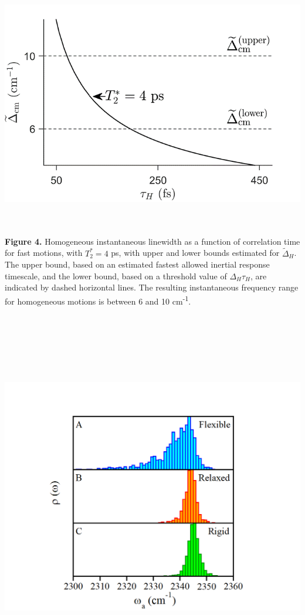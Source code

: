 \documentclass[]{article}
\begin{document}
\includegraphics[width=6.45821in,height=4.31466in]{figure4.png}

\textbf{Figure 4.} Homogeneous instantaneous linewidth as a function of
correlation time for fast motions, with \(T_{2}^{*} = 4\) ps, with upper
and lower bounds estimated for \({\widetilde{\Delta}}_{H}\). The upper
bound, based on an estimated fastest allowed inertial response
timescale, and the lower bound, based on a threshold value of
\(\Delta_{H}\tau_{H}\), are indicated by dashed horizontal lines. The
resulting instantaneous frequency range for homogeneous motions is
between 6 and 10 cm\textsuperscript{-1}.

\includegraphics[width=6.43125in,height=6.41597in]{figure5.png}
\end{document}
